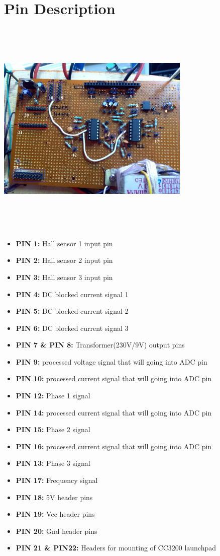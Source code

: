 \documentclass[a4paper,12pt,oneside]{book}
\begin{document}
\section*{Pin Description}
\begin{center}
	\includegraphics[width=350px,height=400px]{board}
\end{center}
\begin{itemize}
	\item \textbf{PIN 1:} Hall sensor 1 input pin 
	\item \textbf{PIN 2:} Hall sensor 2 input pin
	\item \textbf{PIN 3:} Hall sensor 3 input pin
	\item \textbf{PIN 4:} DC blocked current signal 1
	\item \textbf{PIN 5:} DC blocked current signal 2
	\item \textbf{PIN 6:} DC blocked current signal 3
	\item \textbf{PIN 7 \& PIN 8:} Transformer(230V/9V) output pins
	\item \textbf{PIN 9:} processed voltage signal that will going into ADC pin
	\item \textbf{PIN 10:} processed current signal that will going into ADC pin
	\item \textbf{PIN 12:} Phase 1 signal 
	\item \textbf{PIN 14:} processed current signal that will going into ADC pin
	\item \textbf{PIN 15:} Phase 2 signal 
	\item \textbf{PIN 16:} processed current signal that will going into ADC pin
	\item \textbf{PIN 13:} Phase 3 signal 
	\item \textbf{PIN 17:} Frequency signal
	\item \textbf{PIN 18:} 5V header pins
	\item \textbf{PIN 19:} Vcc header pins
	\item \textbf{PIN 20:} Gnd header pins
	\item \textbf{PIN 21 \& PIN22:} Headers for mounting of CC3200 launchpad
\end{itemize}
\newpage
\end{document}
